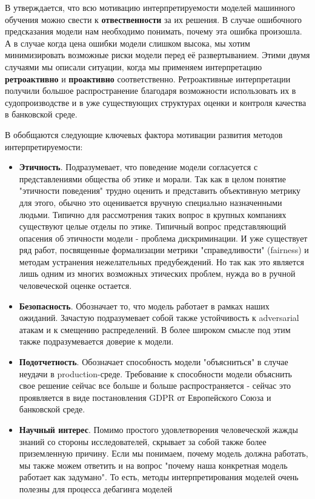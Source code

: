 В \cite{madsenPosthocInterpretabilityNeural2021} утверждается, что всю мотивацию интерпретируемости моделей машинного обучения можно свести к \textbf{отвественности} за их решения. В случае ошибочного предсказания модели нам необходимо понимать, почему эта ошибка произошла. А в случае когда цена ошибки модели слишком высока, мы хотим минимизировать возможные риски модели перед её развертыванием. %
Этими двумя случаями мы описали ситуации, когда мы применяем интерпретацию \textbf{ретроактивно} и \textbf{проактивно} соответственно. Ретроактивные интерпретации получили большое распространение благодаря возможности использовать их в судопроизводстве и в уже существующих структурах оценки и контроля качества в банковской среде. %

В \cite{madsenPosthocInterpretabilityNeural2021} \cite{doshi-velezRigorousScienceInterpretable2017} обобщаются следующие ключевых фактора мотивации развития методов интерпретируемости:


\begin{itemize}
    \item \textbf{Этичность}. Подразумевает, что поведение модели согласуется с представлениями общества об этике и морали. Так как в целом понятие "этичности поведения" {трудно оценить и представить объективную метрику} для этого, обычно это оценивается вручную специально назначенными людьми. Типично для рассмотрения таких вопрос в крупных компаниях существуют целые отделы по этике.
    Типичный вопрос представляющий опасения об этичности  модели - проблема дискриминации. И уже существует ряд работ, посвященные формализации метрики "справедливости" (fairness) и методам устранения нежелательных предубеждений. Но так как это является лишь одним из многих возможных этических проблем, нужда во в ручной человеческой оценке остается.
    \item \textbf{Безопасность}. Обозначает то, что модель работает в рамках наших ожиданий. Зачастую подразумевает собой также устойчивость к adversarial атакам и к смещению распределений. В более широком смысле \cite{liptonMythosModelInterpretability2018} под этим также подразумевается доверие к модели.
    \item \textbf{Подотчетность}. Обозначает способность модели "объясниться" в случае неудачи в production-среде. Требование к способности модели объяснить свое решение сейчас все больше и больше распространяется - сейчас это проявляется в виде постановления GDPR от Европейского Союза и банковской среде.
    \item \textbf{Научный интерес}. Помимо простого удовлетворения человеческой жажды знаний со стороны исследователей, скрывает за собой также более приземленную причину. Если мы понимаем, почему модель должна работать, мы также можем ответить и на вопрос "почему наша конкретная модель  работает как задумано". То есть, методы интерпретирования моделей очень полезны для процесса дебагинга моделей %
\end{itemize}



